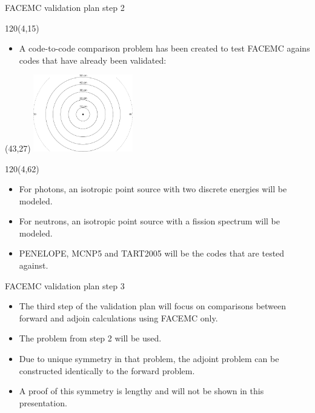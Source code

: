 \documentclass{beamer}
\begin{document}
\begin{frame}{FACEMC validation plan step 2}
  
  \begin{textblock}{120}(4,15)
    \begin{itemize}
      \item A code-to-code comparison problem has been created to test
        FACEMC agains codes that have already been validated:
    \end{itemize}
  \end{textblock}

  \begin{textblock}{20}(43,27)
    \includegraphics[width=1.7in]{figures/code_comparison_problem.pdf}
  \end{textblock}

  \begin{textblock}{120}(4,62)
    \begin{itemize}
      \item For photons, an isotropic point source with two
        discrete energies will be modeled.
      \item For neutrons, an isotropic point source with a
        fission spectrum will be modeled.
      \item PENELOPE, MCNP5 and TART2005 will be the codes
        that are tested against.
    \end{itemize}
  \end{textblock}

\end{frame}

\begin{frame}{FACEMC validation plan step 3}

  \begin{itemize}
    \item The third step of the validation plan will focus
      on comparisons between forward and adjoin calculations
      using FACEMC only.
    \item The problem from step 2 will be used.
    \item Due to unique symmetry in that problem, the adjoint problem can be 
      constructed identically to the forward problem.
    \item A proof of this symmetry is lengthy and will not be shown in this
      presentation.
  \end{itemize}    

\end{frame}
\end{document}
